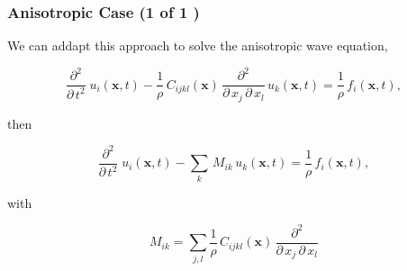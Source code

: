 \documentclass{beamer}
\begin{document}
\begin{frame}
\frametitle{Anisotropic Case (1 of 1	)}
\begin{flushleft}
We can addapt this approach to solve the anisotropic wave equation,
\end{flushleft}
\begin{equation*}
\frac{ \partial^2 }{ \partial \, t^2} \; u_i(\mathbf{x},t)  - \frac{1}{\rho} \, C_{ijkl}(\mathbf{x}) \, \frac{\partial^2 }{\partial \, x_j \, \partial \, x_l} \, u_k(\mathbf{x},t) = \frac{1}{\rho} \, f_i(\mathbf{x},t),
\end{equation*}
\begin{flushleft}
then
\end{flushleft}
\begin{equation*}
\frac{ \partial^2 }{ \partial \, t^2} \; u_i(\mathbf{x},t)  - \sum_{k} \, M_{ik} \, u_k(\mathbf{x},t) = \frac{1}{\rho} \, f_i(\mathbf{x},t),
\end{equation*}
\begin{flushleft}
with
\end{flushleft}
\begin{equation*}
M_{ik} = \sum_{j,l} \frac{1}{\rho} \, C_{ijkl}(\mathbf{x}) \, \frac{\partial^2 }{\partial \, x_j \, \partial \, x_l}
\end{equation*}
\end{frame}
\end{document}
